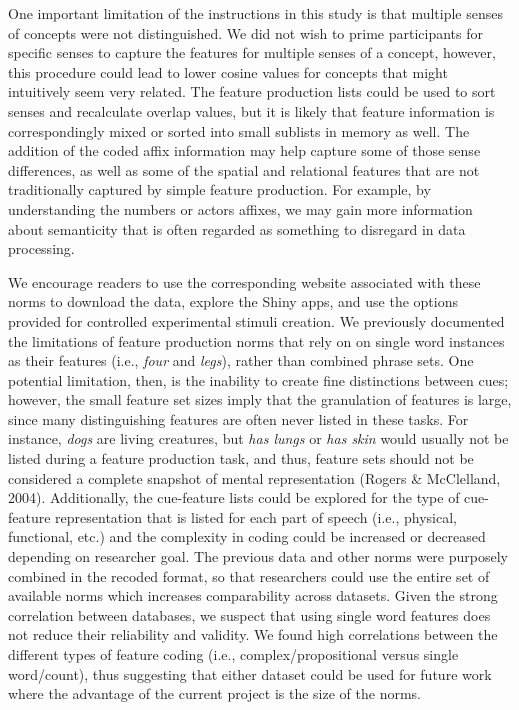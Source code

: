 \documentclass[english,,man]{apa6}
\theoremstyle{definition}
\theoremstyle{definition}
\theoremstyle{definition}
\theoremstyle{remark}
\begin{document}
One important limitation of the instructions in this study is that
multiple senses of concepts were not distinguished. We did not wish to
prime participants for specific senses to capture the features for
multiple senses of a concept, however, this procedure could lead to
lower cosine values for concepts that might intuitively seem very
related. The feature production lists could be used to sort senses and
recalculate overlap values, but it is likely that feature information is
correspondingly mixed or sorted into small sublists in memory as well.
The addition of the coded affix information may help capture some of
those sense differences, as well as some of the spatial and relational
features that are not traditionally captured by simple feature
production. For example, by understanding the numbers or actors affixes,
we may gain more information about semanticity that is often regarded as
something to disregard in data processing.

We encourage readers to use the corresponding website associated with
these norms to download the data, explore the Shiny apps, and use the
options provided for controlled experimental stimuli creation. We
previously documented the limitations of feature production norms that
rely on on single word instances as their features (i.e., \emph{four}
and \emph{legs}), rather than combined phrase sets. One potential
limitation, then, is the inability to create fine distinctions between
cues; however, the small feature set sizes imply that the granulation of
features is large, since many distinguishing features are often never
listed in these tasks. For instance, \emph{dogs} are living creatures,
but \emph{has lungs} or \emph{has skin} would usually not be listed
during a feature production task, and thus, feature sets should not be
considered a complete snapshot of mental representation (Rogers \&
McClelland, 2004). Additionally, the cue-feature lists could be explored
for the type of cue-feature representation that is listed for each part
of speech (i.e., physical, functional, etc.) and the complexity in
coding could be increased or decreased depending on researcher goal. The
previous data and other norms were purposely combined in the recoded
format, so that researchers could use the entire set of available norms
which increases comparability across datasets. Given the strong
correlation between databases, we suspect that using single word
features does not reduce their reliability and validity. We found high
correlations between the different types of feature coding (i.e.,
complex/propositional versus single word/count), thus suggesting that
either dataset could be used for future work where the advantage of the
current project is the size of the norms.
\end{document}
